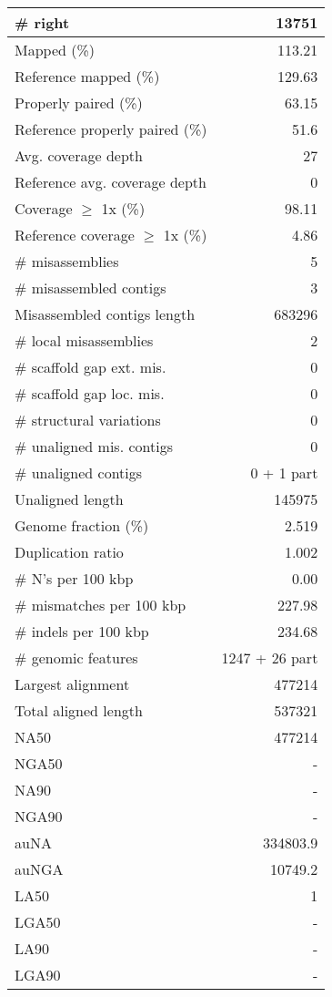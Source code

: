 \documentclass[12pt,a4paper]{article}
\begin{document}
\begin{table}[ht]
\begin{center}
\begin{tabular}{|l*{1}{|r}|}
\# right & 13751 \\ \hline
Mapped (\%) & 113.21 \\ \hline
Reference mapped (\%) & 129.63 \\ \hline
Properly paired (\%) & 63.15 \\ \hline
Reference properly paired (\%) & 51.6 \\ \hline
Avg. coverage depth & 27 \\ \hline
Reference avg. coverage depth & 0 \\ \hline
Coverage $\geq$ 1x (\%) & 98.11 \\ \hline
Reference coverage $\geq$ 1x (\%) & 4.86 \\ \hline
\# misassemblies & 5 \\ \hline
\# misassembled contigs & 3 \\ \hline
Misassembled contigs length & 683296 \\ \hline
\# local misassemblies & 2 \\ \hline
\# scaffold gap ext. mis. & 0 \\ \hline
\# scaffold gap loc. mis. & 0 \\ \hline
\# structural variations & 0 \\ \hline
\# unaligned mis. contigs & 0 \\ \hline
\# unaligned contigs & 0 + 1 part \\ \hline
Unaligned length & 145975 \\ \hline
Genome fraction (\%) & 2.519 \\ \hline
Duplication ratio & 1.002 \\ \hline
\# N's per 100 kbp & 0.00 \\ \hline
\# mismatches per 100 kbp & 227.98 \\ \hline
\# indels per 100 kbp & 234.68 \\ \hline
\# genomic features & 1247 + 26 part \\ \hline
Largest alignment & 477214 \\ \hline
Total aligned length & 537321 \\ \hline
NA50 & 477214 \\ \hline
NGA50 & - \\ \hline
NA90 & - \\ \hline
NGA90 & - \\ \hline
auNA & 334803.9 \\ \hline
auNGA & 10749.2 \\ \hline
LA50 & 1 \\ \hline
LGA50 & - \\ \hline
LA90 & - \\ \hline
LGA90 & - \\ \hline
\end{tabular}
\end{center}
\end{table}
\end{document}

